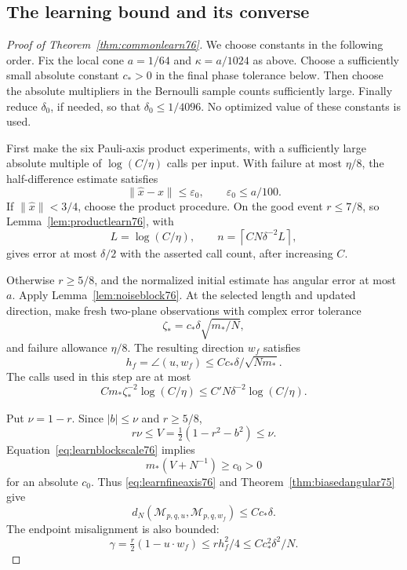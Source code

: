 \subsection{The learning bound and its converse}

\begin{proof}[Proof of Theorem~\ref{thm:commonlearn76}]
We choose constants in the following order.  Fix the local cone
$a=1/64$ and $\kappa=a/1024$ as above.  Choose a sufficiently small
absolute constant $c_*>0$ in the final phase tolerance below.
Then choose the absolute multipliers in the Bernoulli sample counts
sufficiently large.  Finally reduce $\delta_0$, if needed, so that
$\delta_0\le1/4096$.  No optimized value of these constants is used.

First make the six Pauli-axis product experiments, with a sufficiently
large absolute multiple of $\log(C/\eta)$ calls per input.  With
failure at most $\eta/8$, the half-difference estimate satisfies
\[
 \|\widehat x-x\|\le\varepsilon_0,
 \qquad \varepsilon_0\le a/100.
\]
If $\|\widehat x\|<3/4$, choose the product procedure.  On the good
event $r\le7/8$, so Lemma~\ref{lem:productlearn76}, with
\[
 L=\log(C/\eta),\qquad
 n=\left\lceil CN\delta^{-2}L\right\rceil,
\]
gives error at most $\delta/2$ with the asserted call count, after
increasing $C$.

Otherwise $r\ge5/8$, and the normalized initial estimate has
angular error at most $a$.  Apply Lemma~\ref{lem:noiseblock76}.
At the selected length and updated direction, make fresh
two-plane observations with complex error tolerance
\begin{equation}\label{eq:learnfinetolerance76}
 \zeta_*=c_*\delta\sqrt{m_*/N},
\end{equation}
and failure allowance $\eta/8$.  The resulting direction $w_f$
satisfies
\begin{equation}\label{eq:learnfineaxis76}
 h_f=\angle(u,w_f)
       \le Cc_*\delta/\sqrt{Nm_*}.
\end{equation}
The calls used in this step are at most
\begin{equation}\label{eq:learnfinecost76}
 Cm_*\zeta_*^{-2}\log(C/\eta)
       \le C'N\delta^{-2}\log(C/\eta).
\end{equation}

Put $\nu=1-r$.  Since $|b|\le\nu$ and $r\ge5/8$,
\[
 r\nu\le V=\tfrac12(1-r^2-b^2)\le\nu.
\]
Equation~\eqref{eq:learnblockscale76} implies
\begin{equation}\label{eq:learnblockvariance76}
 m_*(V+N^{-1})\ge c_0>0
\end{equation}
for an absolute $c_0$.  Thus \eqref{eq:learnfineaxis76} and
Theorem~\ref{thm:biasedangular75} give
\begin{equation}\label{eq:learnhighangle76}
 d_N(\mathcal M_{p,q,u},\mathcal M_{p,q,w_f})
       \le Cc_*\delta.
\end{equation}
The endpoint misalignment is also bounded:
\begin{equation}\label{eq:learnhighgamma76}
 \gamma=\tfrac r2(1-u\cdot w_f)
       \le rh_f^2/4\le Cc_*^2\delta^2/N.
\end{equation}


\end{proof}
